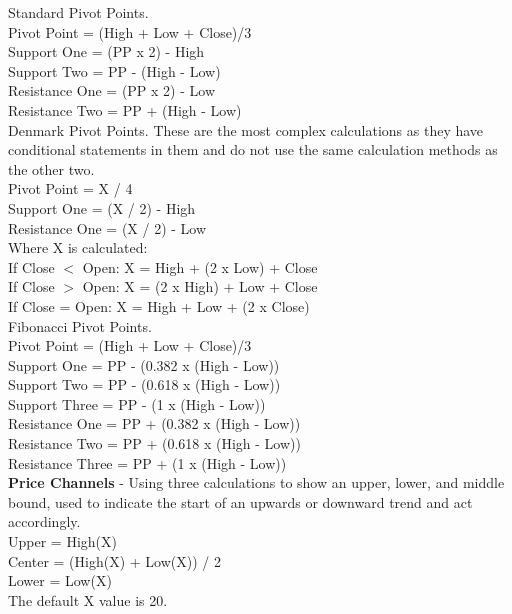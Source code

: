 \documentclass[12pt,a4paper]{article}
\begin{document}
Standard Pivot Points. \\
Pivot Point = (High + Low + Close)/3\\
Support One = (PP x 2) - High\\
Support Two = PP - (High - Low)\\
Resistance One = (PP x 2) - Low\\
Resistance Two = PP + (High - Low)\\

Denmark Pivot Points. These are the most complex calculations as they have conditional statements in them and do not use the same calculation methods as the other two.\\
Pivot Point = X / 4\\
Support One = (X / 2) - High\\
Resistance One = (X / 2) - Low\\

Where X is calculated: \\
If Close $<$ Open: X = High + (2 x Low) + Close\\
If Close $>$ Open: X = (2 x High) + Low + Close\\
If Close = Open: X = High + Low + (2 x Close)\\

Fibonacci Pivot Points. \\
Pivot Point = (High + Low + Close)/3\\
Support One = PP - (0.382 x (High  -  Low))\\
Support Two = PP - (0.618 x (High  -  Low))\\
Support Three = PP - (1 x (High  -  Low))\\
Resistance One = PP + (0.382 x (High  -  Low))\\
Resistance Two = PP + (0.618 x (High  -  Low))\\
Resistance Three = PP + (1 x (High  -  Low))\\

\iffalse
[]
\fi

\textbf{Price Channels} - Using three calculations to show an upper, lower, and middle bound, used to indicate the start of an upwards or downward trend and act accordingly.\\

Upper = High(X)\\
Center = (High(X) + Low(X)) / 2\\
Lower = Low(X)\\
The default X value is 20.\\
\end{document}
